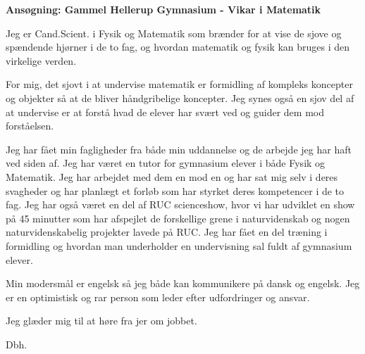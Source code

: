 \documentclass[10pt,a4paper]{letter}
\begin{document}
\begin{letter}{}
\opening{\textbf{Ansøgning: Gammel Hellerup Gymnasium - Vikar i Matematik}}

Jeg er Cand.Scient. i Fysik og Matematik som brænder for at vise de sjove og spændende hjørner i de to fag, og hvordan matematik og fysik kan bruges i den virkelige verden. 

For mig, det sjovt i at undervise matematik er formidling af kompleks koncepter og objekter så at de bliver håndgribelige koncepter. Jeg synes også en sjov del af at undervise er at forstå hvad de elever har svært ved og guider dem mod forståelsen.

Jeg har fået min fagligheder fra både min uddannelse og de arbejde jeg har haft ved siden af. Jeg har været en tutor for gymnasium elever i både Fysik og Matematik. Jeg har arbejdet med dem en mod en og har sat mig selv i deres svagheder og har planlægt et forløb som har styrket deres kompetencer i de to fag. Jeg har også været en del af RUC scienceshow, hvor vi har udviklet en show på 45 minutter som har afspejlet de forskellige grene i naturvidenskab og nogen naturvidenskabelig projekter lavede på RUC. Jeg har fået en del træning i formidling og hvordan man underholder en undervisning sal fuldt af gymnasium elever. 

Min modersmål er engelsk så jeg både kan kommunikere på dansk og engelsk. Jeg er en optimistisk og rar person som leder efter udfordringer og ansvar.  

Jeg glæder mig til at høre fra jer om jobbet.  

\closing{Dbh.}

\end{letter}

\end{document}
